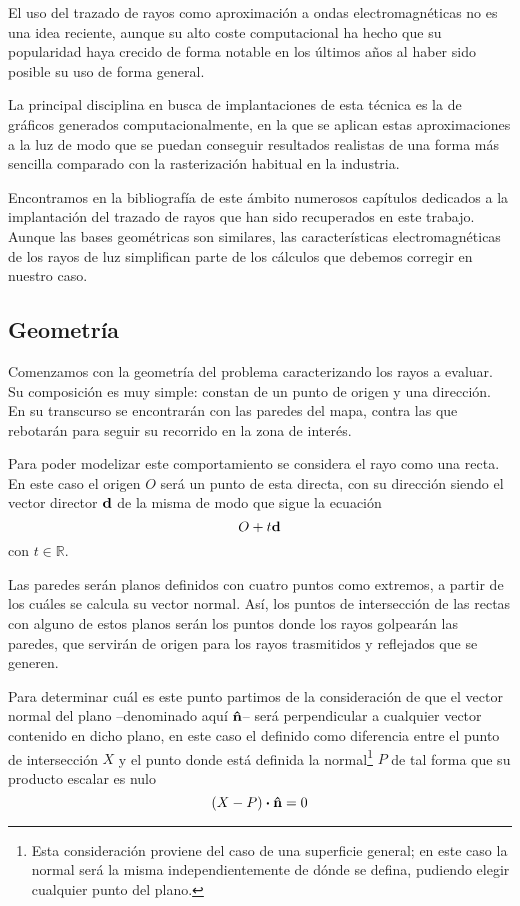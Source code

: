 El uso del trazado de rayos como aproximación a ondas electromagnéticas no es una idea reciente, aunque su alto coste computacional ha hecho que su popularidad haya crecido de forma notable en los últimos años al haber sido posible su uso de forma general.

La principal disciplina en busca de implantaciones de esta técnica es la de gráficos generados computacionalmente, en la que se aplican estas aproximaciones a la luz de modo que se puedan conseguir resultados realistas de una forma más sencilla comparado con la rasterización habitual en la industria.

Encontramos en la bibliografía de este ámbito numerosos capítulos dedicados a la implantación del trazado de rayos que han sido recuperados en este trabajo.
Aunque las bases geométricas son similares, las características electromagnéticas de los rayos de luz simplifican parte de los cálculos que debemos corregir en nuestro caso.

\subsection{Geometría}

Comenzamos con la geometría del problema caracterizando los rayos a evaluar.
Su composición es muy simple: constan de un punto de origen y una dirección.
En su transcurso se encontrarán con las paredes del mapa, contra las que rebotarán para seguir su recorrido en la zona de interés.

Para poder modelizar este comportamiento se considera el rayo como una recta.
En este caso el origen $O$ será un punto de esta directa, con su dirección siendo el vector director $\vb{d}$ de la misma de modo que sigue la ecuación
\begin{equation}
    O + t\vb{d}
\end{equation}
con $t\in \mathbb{R}$.

Las paredes serán planos definidos con cuatro puntos como extremos, a partir de los cuáles se calcula su vector normal.
Así, los puntos de intersección de las rectas con alguno de estos planos serán los puntos donde los rayos golpearán las paredes, que servirán de origen para los rayos trasmitidos y reflejados que se generen.

Para determinar cuál es este punto partimos de la consideración de que el vector normal del plano --denominado aquí $\vu{n}$-- será perpendicular a cualquier vector contenido en dicho plano, en este caso el definido como diferencia entre el punto de intersección $X$ y el punto donde está definida la normal\footnote{Esta consideración proviene del caso de una superficie general; en este caso la normal será la misma independientemente de dónde se defina, pudiendo elegir cualquier punto del plano.} $P$ de tal forma que su producto escalar es nulo
\begin{equation}\label{eq:Plano-recta1}
    (X-P)\vdot\vu{n} = 0
\end{equation}

